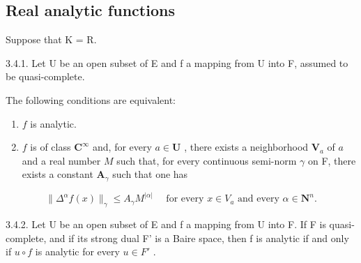 \subsection{Real analytic functions}

Suppose that K = R.

3.4.1. Let U be an open subset of E and f a mapping from U into F, assumed to be quasi-complete.

The following conditions are equivalent:

\begin{enumerate}
\def\labelenumi{(\roman{enumi})}
\item
  \(f\) is analytic.
\item
  \(f\) is of class \(\mathbf{C}^{\infty}\) and, for every \(a\in\mathbf{U} \) , there exists a neighborhood \(\mathbf{V}_{a}\) of \(a\) and a real number \(M\) such that, for every continuous semi-norm \(\gamma\) on F, there exists a constant \(\mathbf{A}_{\gamma}\) such that one has
\end{enumerate}

\[
\| \Delta^ {\alpha} f (x) \| _ {\gamma} \leqslant A _ {\gamma} M ^ {| \alpha |} \quad \text {   for   every   } x \in V _ {a} \text {   and   every   } \alpha \in \mathbf {N} ^ {n}.
\]

3.4.2. Let U be an open subset of E and f a mapping from U into F. If F is quasi-complete, and if its strong dual F' is a Baire space, then f is analytic if and only if \(u \circ f\) is analytic for every \(u \in F'\) .

